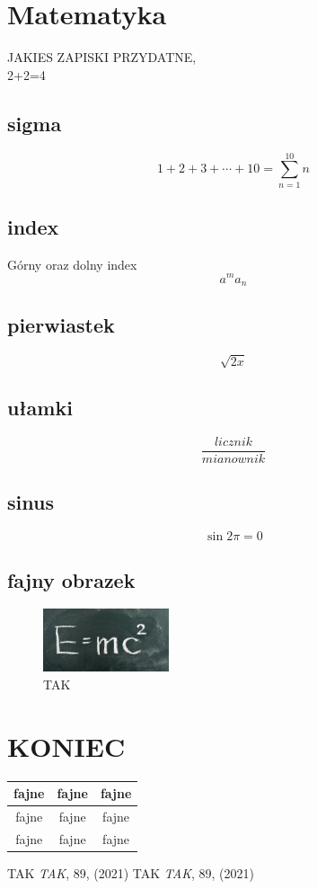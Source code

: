 \documentclass[]{article}
\begin{document}
\section{Matematyka}

JAKIES ZAPISKI  PRZYDATNE,\\
2+2=4\\
\subsection{sigma}
\[
1+2+3+\cdots+10=\sum_{n=1}^{10}n
\]
\subsection{index}
Górny oraz dolny index
\[ 
a^m
a_{n}
\]

\subsection{pierwiastek}
\[ 
\sqrt{2x}
\]

\subsection{ułamki}
\[
\frac{licznik}{mianownik}
\]

\subsection{sinus}
\[
\sin 2\pi=0
\]
\subsection {fajny obrazek}
\begin{figure}[ht]
\centering
\includegraphics[width=0.33\textwidth]{rysunek}
 \caption{TAK}

\end{figure}


\section{KONIEC}


\begin{tabular}{|c|c|c|} \hline
fajne & fajne & fajne \\ \hline
fajne & fajne & fajne\\ \hline
fajne & fajne & fajne \\ \hline
\end{tabular} 

\begin{thebibliography}{1}
\bibitem{}TAK \emph{TAK}, 89, (2021) 
\bibitem{} TAK \emph{TAK}, 89, (2021) 
\end{thebibliography}
\end{document}
